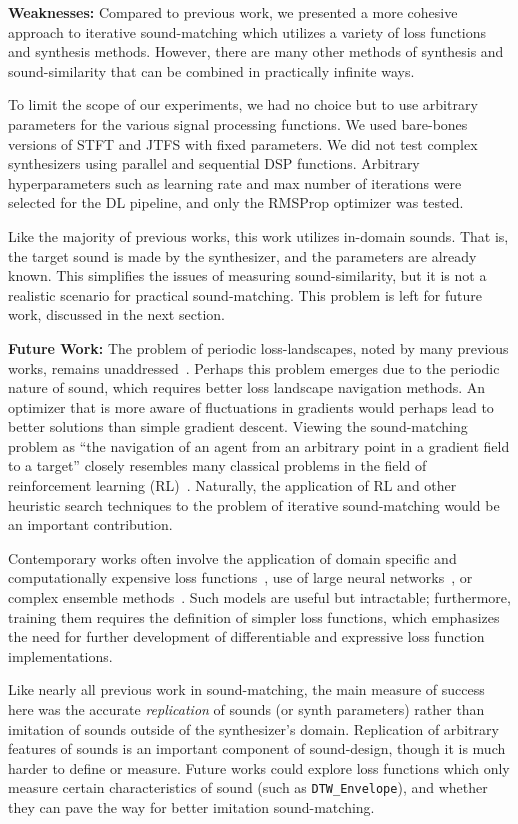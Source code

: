 \documentclass[lettersize,journal]{IEEEtran}
\newcommand{\DTWEnv}{\texttt{DTW\_Envelope}}
\begin{document}
\textbf{Weaknesses:} Compared to previous work, we presented a more cohesive approach to iterative sound-matching which utilizes a variety of loss functions and synthesis methods. However, there are many other methods of synthesis and sound-similarity that can be combined in practically infinite ways. 

To limit the scope of our experiments, we had no choice but to use arbitrary parameters for the various signal processing functions. We used bare-bones versions of STFT and JTFS with fixed parameters. We did not test complex synthesizers using parallel and sequential DSP functions. Arbitrary hyperparameters such as learning rate and max number of iterations were selected for the DL pipeline, and only the RMSProp optimizer was tested. 

 Like the majority of previous works, this work utilizes in-domain sounds. That is, the target sound is made by the synthesizer, and the parameters are already known. This simplifies the issues of measuring sound-similarity, but it is not a realistic scenario for practical sound-matching. This problem is left for future work, discussed in the next section.

\label{sec:future}
\textbf{Future Work: } The problem of periodic loss-landscapes, noted by many previous works, remains unaddressed~\cite{turian2020sorry,vahidi2023mesostructures,uzrad2024diffmoog,bruford2024synthesizer}. Perhaps this problem emerges due to the periodic nature of sound, which requires better loss landscape navigation methods. An optimizer that is more aware of fluctuations in gradients would perhaps lead to better solutions than simple gradient descent. Viewing the sound-matching problem as ``the navigation of an agent from an arbitrary point in a gradient field to a target'' closely resembles many classical problems in the field of reinforcement learning (RL)~\cite{sutton2018reinforcement}. Naturally, the application of RL and other heuristic search techniques to the problem of iterative sound-matching would be an important contribution.

Contemporary works often involve the application of domain specific and computationally expensive loss functions~\cite{han2023perceptual,uzrad2024diffmoog}, use of large neural networks~\cite{hershey2017cnn,cramer2019look}, or complex ensemble methods~\cite{turian2022hear}. Such models are useful but intractable; furthermore, training them requires the definition of simpler loss functions, which emphasizes the need for further development of differentiable and expressive loss function implementations. 

Like nearly all previous work in sound-matching, the main measure of success here was the accurate \textit{replication} of sounds (or synth parameters) rather than imitation of sounds outside of the synthesizer's domain. Replication of arbitrary features of sounds is an important component of sound-design, though it is much harder to define or measure. Future works could explore loss functions which only measure certain characteristics of sound (such as \DTWEnv), and whether they can pave the way for better imitation sound-matching.



\end{document}
